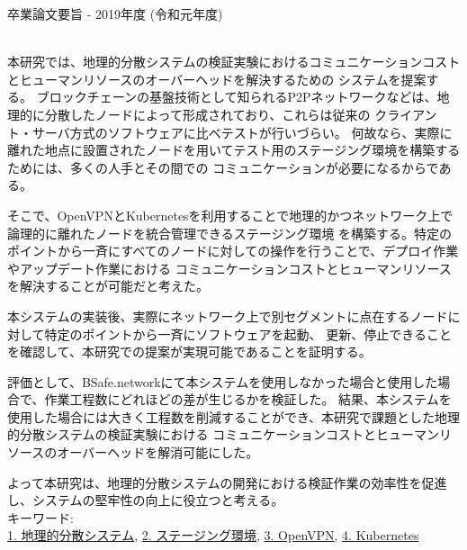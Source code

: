 卒業論文要旨 - 2019年度 (令和元年度)
\begin{center}
\begin{large}
\end{large}
\end{center}

~ \\
本研究では、地理的分散システムの検証実験におけるコミュニケーションコストとヒューマンリソースのオーバーヘッドを解決するための
システムを提案する。
ブロックチェーンの基盤技術として知られるP2Pネットワークなどは、地理的に分散したノードによって形成されており、これらは従来の
クライアント・サーバ方式のソフトウェアに比べテストが行いづらい。
何故なら、実際に離れた地点に設置されたノードを用いてテスト用のステージング環境を構築するためには、多くの人手とその間での
コミュニケーションが必要になるからである。

そこで、OpenVPNとKubernetesを利用することで地理的かつネットワーク上で論理的に離れたノードを統合管理できるステージング環境
を構築する。特定のポイントから一斉にすべてのノードに対しての操作を行うことで、デプロイ作業やアップデート作業における
コミュニケーションコストとヒューマンリソースを解決することが可能だと考えた。

本システムの実装後、実際にネットワーク上で別セグメントに点在するノードに対して特定のポイントから一斉にソフトウェアを起動、
更新、停止できることを確認して、本研究での提案が実現可能であることを証明する。

評価として、BSafe.networkにて本システムを使用しなかった場合と使用した場合で、作業工程数にどれほどの差が生じるかを検証した。
結果、本システムを使用した場合には大きく工程数を削減することができ、本研究で課題とした地理的分散システムの検証実験における
コミュニケーションコストとヒューマンリソースのオーバーヘッドを解消可能にした。

よって本研究は、地理的分散システムの開発における検証作業の効率性を促進し、システムの堅牢性の向上に役立つと考える。
~ \\
キーワード:\\
\underline{1. 地理的分散システム},
\underline{2. ステージング環境},
\underline{3. OpenVPN},
\underline{4. Kubernetes}
\begin{flushright}
\dept \\
\author
\end{flushright}
